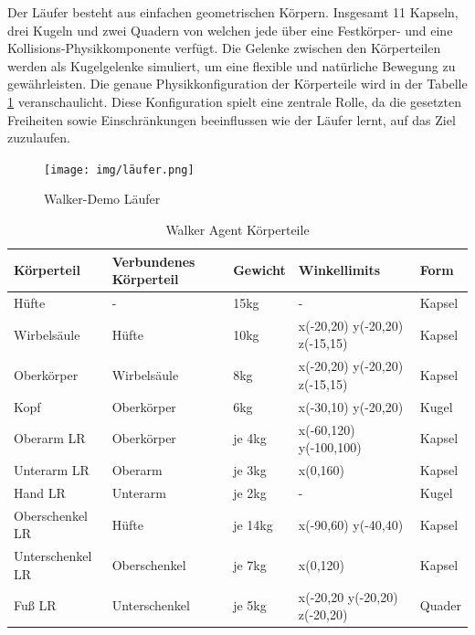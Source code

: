 Der Läufer besteht aus einfachen geometrischen Körpern. Insgesamt 11 Kapseln, drei Kugeln und zwei Quadern von welchen jede über eine Festkörper- und eine Kollisions-Physikkomponente verfügt. Die Gelenke zwischen den Körperteilen werden als Kugelgelenke simuliert, um eine flexible und natürliche Bewegung zu gewährleisten. Die genaue Physikkonfiguration der Körperteile wird in der Tabelle \ref{table:walker_körperteile} veranschaulicht. Diese Konfiguration spielt eine zentrale Rolle, da die gesetzten Freiheiten sowie Einschränkungen beeinflussen wie der Läufer lernt, auf das Ziel zuzulaufen.

\begin{figure}[H]
  \centering  
  \texttt{[image: img/läufer.png]}
  \caption{Walker-Demo Läufer}
  \label{fig:läufer}
\end{figure}

\begin{table}[H]
  \centering
  {
  \begin{tabular}{ |p{3cm}|p{3cm}|p{2cm}|p{4cm}|p{2cm}| }
  \hline
  \textbf{Körpertei}l& \textbf{Verbundenes Körperteil} & \textbf{Gewicht} & \textbf{Winkellimits} & \textbf{Form} \\
  \hline
  Hüfte & - & 15kg & - & Kapsel \\
  \hline
  Wirbelsäule & Hüfte & 10kg & x(-20,20) y(-20,20) z(-15,15) & Kapsel \\
  \hline
  Oberkörper & Wirbelsäule & 8kg & x(-20,20) y(-20,20) z(-15,15) & Kapsel \\
  \hline
  Kopf & Oberkörper & 6kg & x(-30,10) y(-20,20) & Kugel \\
  \hline
  Oberarm LR & Oberkörper & je 4kg & x(-60,120) y(-100,100) & Kapsel \\
  \hline
  Unterarm LR & Oberarm & je 3kg & x(0,160) & Kapsel \\
  \hline
  Hand LR & Unterarm & je 2kg & - & Kugel \\
  \hline
  Oberschenkel LR & Hüfte & je 14kg& x(-90,60) y(-40,40) & Kapsel \\
  \hline
  Unterschenkel LR & Oberschenkel & je 7kg &  x(0,120) & Kapsel \\
  \hline
  Fuß LR & Unterschenkel & je 5kg & x(-20,20 y(-20,20) z(-20,20) & Quader \\
  \hline
  \end{tabular}}
  \caption{Walker Agent Körperteile}
  \label{table:walker_körperteile}
\end{table}

